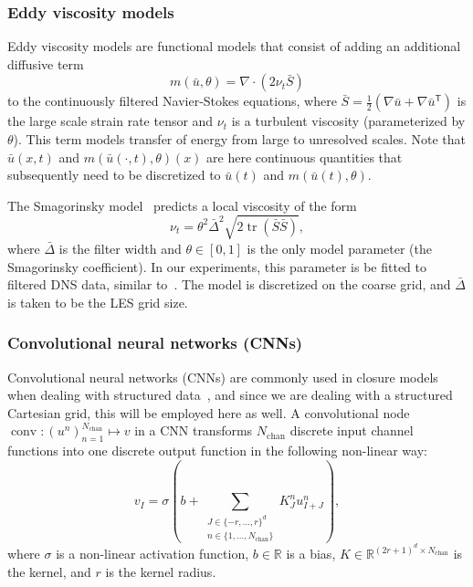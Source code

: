 \documentclass[preprint]{elsarticle}
\begin{document}
\subsubsection{Eddy viscosity models} \label{sec:eddyviscosity}

Eddy viscosity models are functional models that consist of adding an additional
diffusive term
\begin{equation} \label{eq:smagorinsky_closure}
    m(\bar{u}, \theta) = \nabla \cdot (2 \nu_t \bar{S})
\end{equation}
to the continuously filtered Navier-Stokes equations, where $\bar{S} =
\frac{1}{2} \left( \nabla \bar{u} + \nabla \bar{u}^\mathsf{T} \right)$ is the
large scale strain rate tensor and $\nu_t$ is a turbulent viscosity
(parameterized by $\theta$). This term models transfer of energy from large to
unresolved scales. Note that $\bar{u}(x, t)$ and $m(\bar{u}(\cdot, t),
\theta)(x)$ are here continuous quantities that subsequently need to be
discretized to $\bar{u}(t)$ and $m(\bar{u}(t), \theta)$.

The Smagorinsky model~\cite{Smagorinsky1963,Lilly1967} predicts a local
viscosity of the form
\begin{equation}
    \nu_t = \theta^2 \bar{\Delta}^2 \sqrt{2 \operatorname{tr}(\bar{S} \bar{S})},
\end{equation}
where $\bar{\Delta}$ is the filter width and $\theta \in [0, 1]$ is the only
model parameter (the Smagorinsky coefficient). In our experiments, this
parameter is be fitted to filtered DNS data, similar to~\cite{Shankar2022,Guan2023}.
The model is discretized on the coarse grid, and $\bar{\Delta}$ is taken to be
the LES grid size.

\subsubsection{Convolutional neural networks (CNNs)} \label{sec:cnn}

Convolutional neural networks (CNNs) are commonly used in closure models when
dealing with structured data~\cite{Beck2019,Shankar2022,Guan2023,List2022}, and
since we are dealing with a structured Cartesian grid, this will be employed
here as well. A convolutional node $\operatorname{conv} : (u^n)_{n =
1}^{N_\text{chan}} \mapsto v$ in a CNN transforms $N_\text{chan}$ discrete input
channel functions into one discrete output function in the following non-linear
way:
\begin{equation}
    v_I = \sigma \left( b +
    \sum_{\substack{J \in \{-r, \dots, r\}^d \\ n \in \{1, \dots, N_\text{chan}\}}}
    K^n_J u^n_{I + J} \right),
\end{equation}
where
$\sigma$ is a non-linear activation function,
$b \in \mathbb{R}$ is a bias,
$K \in \mathbb{R}^{(2 r + 1)^d \times N_\text{chan}}$ is the kernel,
and $r$ is the kernel radius.
\end{document}
